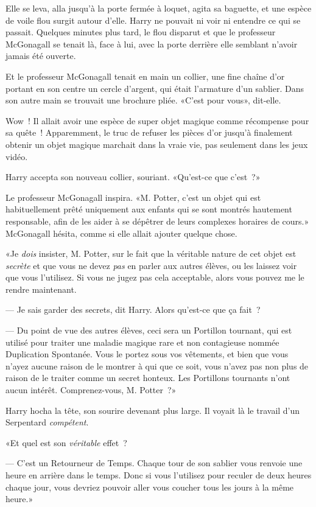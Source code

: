 Elle se leva, alla jusqu'à la porte fermée à loquet, agita sa baguette, et une espèce de voile flou surgit autour d'elle. Harry ne pouvait ni voir ni entendre ce qui se passait. Quelques minutes plus tard, le flou disparut et que le professeur McGonagall se tenait là, face à lui, avec la porte derrière elle semblant n'avoir jamais été ouverte.

Et le professeur McGonagall tenait en main un collier, une fine chaîne d'or portant en son centre un cercle d'argent, qui était l'armature d'un sablier. Dans son autre main se trouvait une brochure pliée. «C'est pour vous», dit-elle.

Wow~! Il allait avoir une espèce de super objet magique comme récompense pour sa quête~! Apparemment, le truc de refuser les pièces d'or jusqu'à finalement obtenir un objet magique marchait dans la vraie vie, pas seulement dans les jeux vidéo.

Harry accepta son nouveau collier, souriant. «Qu'est-ce que c'est~?»

Le professeur McGonagall inspira. «M. Potter, c'est un objet qui est habituellement prêté uniquement aux enfants qui se sont montrés hautement responsable, afin de les aider à se dépêtrer de leurs complexes horaires de cours.» McGonagall hésita, comme si elle allait ajouter quelque chose.

«Je \emph{dois} insister, M. Potter, sur le fait que la véritable nature de cet objet est \emph{secrète} et que vous ne devez \emph{pas} en parler aux autres élèves, ou les laissez voir que vous l'utilisez. Si vous ne jugez pas cela acceptable, alors vous pouvez me le rendre maintenant.

--- Je sais garder des secrets, dit Harry. Alors qu'est-ce que ça fait~?

--- Du point de vue des autres élèves, ceci sera un Portillon tournant, qui est utilisé pour traiter une maladie magique rare et non contagieuse nommée Duplication Spontanée. Vous le portez sous vos vêtements, et bien que vous n'ayez aucune raison de le montrer à qui que ce soit, vous n'avez pas non plus de raison de le traiter comme un secret honteux. Les Portillons tournants n'ont aucun intérêt. Comprenez-vous, M. Potter~?»

Harry hocha la tête, son sourire devenant plus large. Il voyait là le travail d'un Serpentard \emph{compétent}.

«Et quel est son \emph{véritable} effet~?

--- C'est un Retourneur de Temps. Chaque tour de son sablier vous renvoie une heure en arrière dans le temps. Donc si vous l'utilisez pour reculer de deux heures chaque jour, vous devriez pouvoir aller vous coucher tous les jours à la même heure.»

